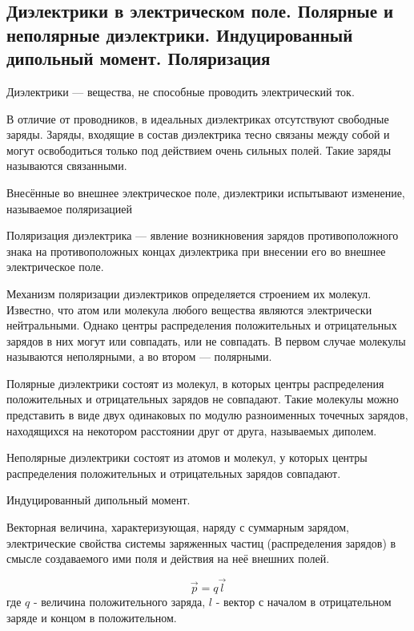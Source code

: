\subsection{Диэлектрики в электрическом поле. Полярные и неполярные диэлектрики. Индуцированный дипольный момент. Поляризация}

\begin{definition}
    Диэлектрики — вещества, не способные проводить электрический ток.

    В отличие от проводников, в идеальных диэлектриках отсутствуют свободные заряды. Заряды, входящие в состав диэлектрика тесно 
    связаны между собой и могут освободиться только под действием очень сильных полей. Такие заряды называются связанными.

    Внесённые во внешнее электрическое поле, диэлектрики испытывают изменение, называемое поляризацией
\end{definition}

\begin{definition}
    Поляризация диэлектрика — явление возникновения зарядов противоположного знака на противоположных концах диэлектрика при 
    внесении его во внешнее электрическое поле.
\end{definition}

\begin{remark}
    Механизм поляризации диэлектриков определяется строением их молекул. Известно, что атом или молекула любого вещества 
    являются электрически нейтральными. Однако центры распределения положительных и отрицательных зарядов в них могут или совпадать, 
    или не совпадать. В первом случае молекулы называются неполярными, а во втором — полярными.

    Полярные диэлектрики состоят из молекул, в которых центры распределения положительных и отрицательных зарядов не совпадают. 
    Такие молекулы можно представить в виде двух одинаковых по модулю разноименных точечных зарядов, находящихся на некотором расстоянии 
    друг от друга, называемых диполем.

    Неполярные диэлектрики состоят из атомов и молекул, у которых центры распределения положительных и отрицательных зарядов совпадают.
\end{remark}

\begin{definition}
    Индуцированный дипольный момент.

    Векторная величина, характеризующая, наряду с суммарным зарядом, электрические свойства системы заряженных частиц (распределения зарядов) 
    в смысле создаваемого ими поля и действия на неё внешних полей.

    $$
    \vec p=q\vec l
    $$
    где $q$ - величина положительного заряда,
    $l$ - вектор с началом в отрицательном заряде и концом в положительном.
\end{definition}

